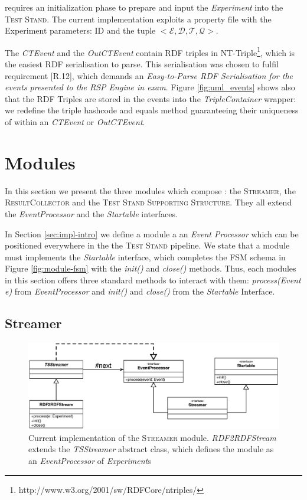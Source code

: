 \name requires an initialization phase to prepare and input the \textit{Experiment} into the \textsc{Test Stand}. The current implementation exploits a property file with the Experiment parameters: ID and the tuple $<\mathcal{E}, \mathcal{D},\mathcal{T},\mathcal{Q}>$. 

The \textit{CTEvent} and the \textit{OutCTEvent} contain RDF triples in NT-Triple\footnote{http://www.w3.org/2001/sw/RDFCore/ntriples/}, which is the easiest RDF serialisation to parse. This serialisation was chosen to fulfil requirement [R.12], which demands an \textit{Easy-to-Parse RDF Serialisation for the events presented to the RSP Engine in exam}. Figure \ref{fig:uml_events} shows also that the RDF Triples are stored in the events into the \textit{TripleContainer} wrapper: we redefine the triple hashcode and equals method guaranteeing their uniqueness of within an \textit{CTEvent} or \textit{OutCTEvent}.

\section{Modules}\label{sec:modules-impl}

In this section we present the three modules which compose \name: the \textsc{Streamer},  the \textsc{ResultCollector} and the  \textsc{Test Stand Supporting Structure}. They all extend the \textit{EventProcessor} and the \textit{Startable} interfaces.

In Section \ref{sec:impl-intro} we define a module a an \textit{Event Processor} which can be positioned everywhere in the the \textsc{Test Stand} pipeline. We state that a module must implements the \textit{Startable} interface, which completes the FSM schema in Figure \ref{fig:module-fsm} with the \textit{init()} and \textit{close()} methods.
Thus, each modules in this section offers three standard methods to interact with them: \textit{process(Event e)} from \textit{EventProcessor} and \textit{init()} and \textit{close()} from the \textit{Startable} Interface.

\subsection{Streamer}	\label{sec:streamer-impl}
\begin{figure}[tbh]
  \centering
	\includegraphics[width=\linewidth]{images/uml_tstreamer}
	\caption[UML Schema: \textit{RDF2RDFStream \textsc{Streamer} Implementation}]{Current implementation of the \textsc{Streamer} module. \textit{RDF2RDFStream} extends the \textit{TSStreamer} abstract class, which defines the module as an \textit{EventProcessor} of \textit{Experiment}s} 
  	\label{fig:uml_tstreamer}
\end{figure}

